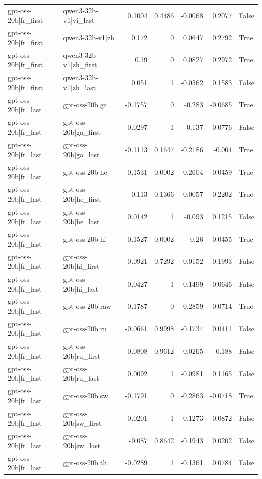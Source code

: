 \begin{table}
\begin{tabular}{l l r r r r l}
gpt-oss-20b|fr_first & qwen3-32b-v1|vi_last & 0.1004 & 0.4486 & -0.0068 & 0.2077 & False \\
gpt-oss-20b|fr_first & qwen3-32b-v1|zh & 0.172 & 0 & 0.0647 & 0.2792 & True \\
gpt-oss-20b|fr_first & qwen3-32b-v1|zh_first & 0.19 & 0 & 0.0827 & 0.2972 & True \\
gpt-oss-20b|fr_first & qwen3-32b-v1|zh_last & 0.051 & 1 & -0.0562 & 0.1583 & False \\
gpt-oss-20b|fr_last & gpt-oss-20b|ga & -0.1757 & 0 & -0.283 & -0.0685 & True \\
gpt-oss-20b|fr_last & gpt-oss-20b|ga_first & -0.0297 & 1 & -0.137 & 0.0776 & False \\
gpt-oss-20b|fr_last & gpt-oss-20b|ga_last & -0.1113 & 0.1647 & -0.2186 & -0.004 & True \\
gpt-oss-20b|fr_last & gpt-oss-20b|he & -0.1531 & 0.0002 & -0.2604 & -0.0459 & True \\
gpt-oss-20b|fr_last & gpt-oss-20b|he_first & 0.113 & 0.1366 & 0.0057 & 0.2202 & True \\
gpt-oss-20b|fr_last & gpt-oss-20b|he_last & 0.0142 & 1 & -0.093 & 0.1215 & False \\
gpt-oss-20b|fr_last & gpt-oss-20b|hi & -0.1527 & 0.0002 & -0.26 & -0.0455 & True \\
gpt-oss-20b|fr_last & gpt-oss-20b|hi_first & 0.0921 & 0.7292 & -0.0152 & 0.1993 & False \\
gpt-oss-20b|fr_last & gpt-oss-20b|hi_last & -0.0427 & 1 & -0.1499 & 0.0646 & False \\
gpt-oss-20b|fr_last & gpt-oss-20b|raw & -0.1787 & 0 & -0.2859 & -0.0714 & True \\
gpt-oss-20b|fr_last & gpt-oss-20b|ru & -0.0661 & 0.9998 & -0.1734 & 0.0411 & False \\
gpt-oss-20b|fr_last & gpt-oss-20b|ru_first & 0.0808 & 0.9612 & -0.0265 & 0.188 & False \\
gpt-oss-20b|fr_last & gpt-oss-20b|ru_last & 0.0092 & 1 & -0.0981 & 0.1165 & False \\
gpt-oss-20b|fr_last & gpt-oss-20b|sw & -0.1791 & 0 & -0.2863 & -0.0718 & True \\
gpt-oss-20b|fr_last & gpt-oss-20b|sw_first & -0.0201 & 1 & -0.1273 & 0.0872 & False \\
gpt-oss-20b|fr_last & gpt-oss-20b|sw_last & -0.087 & 0.8642 & -0.1943 & 0.0202 & False \\
gpt-oss-20b|fr_last & gpt-oss-20b|th & -0.0289 & 1 & -0.1361 & 0.0784 & False \\

\end{tabular}
\end{table}
